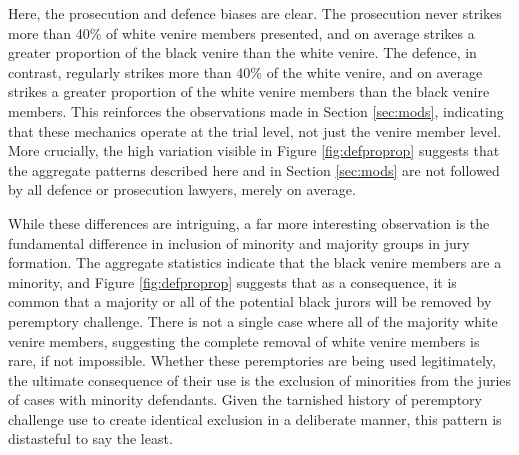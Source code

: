 Here, the prosecution and defence biases are clear. The prosecution never strikes more than 40\% of white venire members
presented, and on average strikes a greater proportion of the black venire than the white venire. The defence, in contrast,
regularly strikes more than 40\% of the white venire, and on average strikes a greater proportion of the white venire members than
the black venire members. This reinforces the observations made in Section \ref{sec:mods}, indicating that these mechanics
operate at the trial level, not just the venire member level. More crucially, the high variation visible in Figure
\ref{fig:defproprop} suggests that the aggregate patterns described here and in Section \ref{sec:mods} are not followed by all defence or
prosecution lawyers, merely on average.

While these differences are intriguing, a far more interesting observation is the
fundamental difference in inclusion of minority and majority groups in jury formation. The aggregate statistics indicate that the
black venire members are a minority, and Figure \ref{fig:defproprop} suggests that as a consequence, it is common that a majority
or all of the potential black jurors will be removed by peremptory
challenge. There is not a single case where all of the majority white venire members, suggesting the complete removal of
white venire members is rare, if not impossible. Whether these peremptories are being used legitimately, the ultimate consequence of their use is the exclusion of minorities from the juries of cases with minority defendants. Given the tarnished history of peremptory challenge use to create identical exclusion in a deliberate manner, this pattern is distasteful to say the least.
